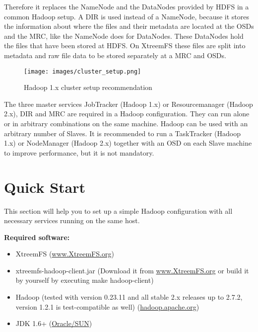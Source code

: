 \documentclass[a4paper,10pt]{book}
\begin{document}
Therefore it replaces the NameNode and the DataNodes provided by HDFS in a common Hadoop setup. A DIR is used instead of a NameNode, because it stores the information about where the files and their metadata are located at the OSDs and the MRC, like the NameNode does for DataNodes. These DataNodes hold the files that have been stored at HDFS. On XtreemFS these files are split into metadata and raw file data to be stored separately at a MRC and OSDs.

\begin{figure}[h]
 \centering
 \texttt{[image: images/cluster\_setup.png]}
 \caption{Hadoop 1.x cluster setup recommendation}
 \label{fig:cluster_setup}
\end{figure}

The three master services JobTracker (Hadoop 1.x) or Resourcemanager (Hadoop 2.x), DIR and MRC are required in a Hadoop configuration. They can run alone or in arbitrary combinations on the same machine. Hadoop can be used with an arbitrary number of Slaves. It is recommended to run a TaskTracker (Hadoop 1.x) or NodeManager (Hadoop 2.x) together with an OSD on each Slave machine to improve performance, but it is not mandatory.

\section{Quick Start}
\label{sec:hadoop_quickstart}

This section will help you to set up a simple Hadoop configuration with all necessary services running on the same host.

\textbf{Required software:}
\begin{itemize}
\item XtreemFS (\href{http://xtreemfs.org/download.php?t=source}{www.XtreemFS.org})
\item xtreemfs-hadoop-client.jar (Download it from \href{http://www.xtreemfs.org/downloads/xtreemfs-hadoop-client.jar}{www.XtreemFS.org} or build it by yourself by executing make hadoop-client)
\item Hadoop (tested with version 0.23.11 and all stable 2.x releases up to 2.7.2, version 1.2.1 is test-compatible as well) (\href{http://hadoop.apache.org}{hadoop.apache.org})
\item JDK 1.6+ (\href{http://java.sun.com}{Oracle/SUN})
\end{itemize}
\end{document}
